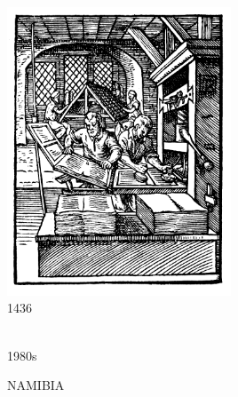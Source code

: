 \documentclass{beamer}
\begin{document}
\begin{frame}
    \begin{center}
    
    \end{center}
\end{frame}

\begin{frame}
\begin{figure}[width=\textwidth]
    
\end{figure}
\end{frame}

\begin{frame}
\begin{center}
    \includegraphics[width=0.5\textwidth]{static/printing.png} \\
    \small{1436}
\end{center}
\end{frame}

\begin{frame}
    \begin{center}
     \\
    \small{1980s}
    \end{center}
\end{frame}

\begin{frame}
\begin{center}
    \Huge{NAMIBIA}
\end{center}
\end{frame}
\end{document}
